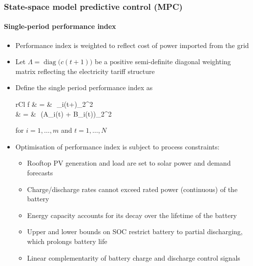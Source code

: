 \documentclass[handout, smaller, xcolor=table]{beamer}			%
\newcommand{\sqrts}[2][]{\,\sqrt[#1]{#2}\,}
\begin{document}
\begin{frame}
	\frametitle{State-space model predictive control (MPC)}
	\framesubtitle{Single-period performance index}

	\begin{itemize}
		\item  Performance index is weighted to reflect cost of power imported from the grid
		
		\item  Let $\Lambda = \operatorname{diag}\big(c(t\!+\!1)\big)$ be a positive semi-definite diagonal weighting matrix reflecting the electricity tariff structure
		
		\item  Define the single period performance index as
			\begin{IEEEeqnarray*}{rCl}
    				f & = & \left\lVert\sqrts{\Lambda}_{i}(t\!+)\right\rVert_{2}^{2}	\\
				& = & \left\lVert\sqrts{\Lambda}\big(A_{i}(t) + B_{i}(t)\big)\right\rVert_{2}^{2}
			\end{IEEEeqnarray*}
			for $i = 1, \ldots, m$ and $t=1, \ldots, N$
			
		\item  Optimisation of performance index is subject to process constraints:
		\begin{itemize}
			\item  Rooftop PV generation and load are set to solar power and demand forecasts %
			\item  Charge/discharge rates cannot exceed rated power (continuous) of the battery
			\item  Energy capacity accounts for its decay over the lifetime of the battery
			\item  Upper and lower bounds on SOC restrict battery to partial discharging, which prolongs battery life
			\item  Linear complementarity of battery charge and discharge control signals
		\end{itemize}		
		
	\end{itemize}

\end{frame}
\end{document}

